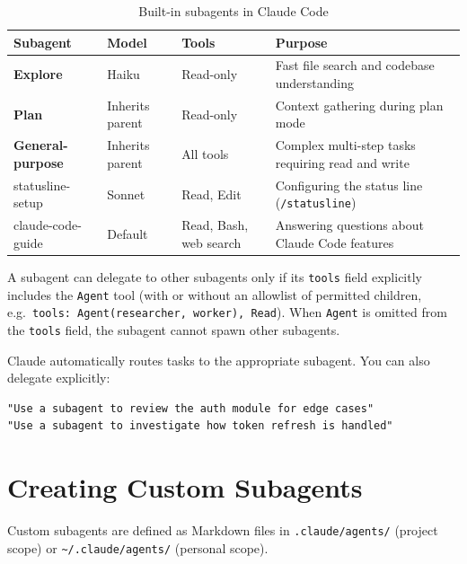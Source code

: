 \begin{table}[ht]
\centering
\caption{Built-in subagents in Claude Code}
\label{tab:built-in-agents}
\begin{tabularx}{\textwidth}{llXl}
\toprule
\textbf{Subagent} & \textbf{Model} & \textbf{Tools} & \textbf{Purpose} \\
\midrule
\textbf{Explore}          & Haiku            & Read-only
  & Fast file search and codebase understanding \\
\textbf{Plan}             & Inherits parent  & Read-only
  & Context gathering during plan mode \\
\textbf{General-purpose}  & Inherits parent  & All tools
  & Complex multi-step tasks requiring read and write \\
statusline-setup          & Sonnet           & Read, Edit
  & Configuring the status line (\texttt{/statusline}) \\
claude-code-guide         & Default          & Read, Bash, web search
  & Answering questions about Claude Code features \\
\bottomrule
\end{tabularx}
\end{table}

\begin{notebox}
A subagent can delegate to other subagents only if its \texttt{tools}
field explicitly includes the \texttt{Agent} tool (with or without an
allowlist of permitted children, e.g.\
\texttt{tools: Agent(researcher, worker), Read}). When \texttt{Agent} is
omitted from the \texttt{tools} field, the subagent cannot spawn other
subagents.
\end{notebox}

Claude automatically routes tasks to the appropriate subagent. You can also
delegate explicitly:

\begin{lstlisting}[caption={Explicit subagent delegation}]
"Use a subagent to review the auth module for edge cases"
"Use a subagent to investigate how token refresh is handled"
\end{lstlisting}

\section{Creating Custom Subagents}
\label{sec:custom-agents}


Custom subagents are defined as Markdown files in \texttt{.claude/agents/}
(project scope) or \texttt{\textasciitilde/.claude/agents/} (personal scope).

